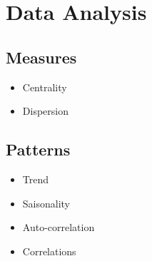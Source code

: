 



\begin{frame}
   \titlepage
\end{frame}



\begin{frame}
   \tableofcontents
\end{frame}

\section{Data Analysis}


\subsection{Measures}

\begin{itemize}
   \item Centrality
   \item Dispersion
\end{itemize}


\subsection{Patterns}

\begin{itemize}
   \item Trend
   \item Saisonality
   \item Auto-correlation
   \item Correlations
\end{itemize}


